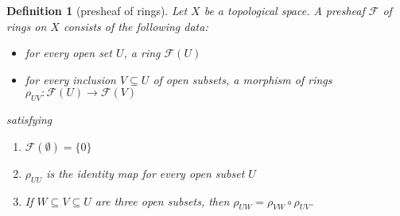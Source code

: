 \documentclass[12pt]{scrartcl}
\newtheorem{definition}[proposition]{Definition}
\begin{document}
\begin{definition}[presheaf of rings]
	Let $X$ be a topological space. A presheaf $\mathscr{F}$ of rings on $X$ consists of the following data:
	\begin{itemize}
		\item for every open set $U$, a ring $\mathscr{F}(U)$
		\item for every inclusion $V \subseteq U$ of open subsets, a morphism of rings $\rho_{UV}: \mathscr{F}(U) \rightarrow \mathscr{F}(V)$  
	\end{itemize}
satisfying 
	\begin{enumerate}
		\item $\mathscr{F}(\emptyset) = \lbrace 0 \rbrace$
		\item $\rho_{UU}$ is the identity map for every open subset $U$
		\item  If $W \subseteq V \subseteq U$ are three open subsets, then $\rho_{UW} = \rho_{VW} \circ \rho_{UV}$.
	\end{enumerate}
\end{definition}

\end{document}

